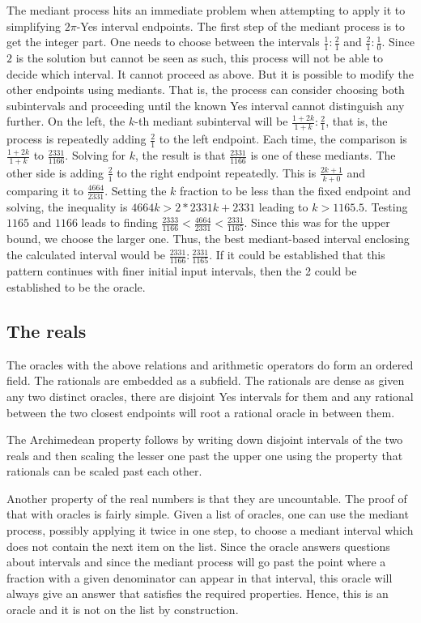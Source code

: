 \documentclass[12pt]{article}
\begin{document}
The mediant process hits an immediate problem when attempting to apply it to simplifying $2\pi$-Yes  interval endpoints. The first step of the mediant process is to get the integer part. One needs to choose between the intervals $\frac{1}{1}:\frac{2}{1}$ and $\frac{2}{1}:\frac{1}{0}$. Since $2$ is the solution but cannot be seen as such, this process will not be able to decide which interval. It cannot proceed as above. But it is possible to modify the other endpoints using mediants. That is, the process can consider choosing both subintervals and proceeding until the known Yes interval cannot distinguish any further. On the left, the $k$-th mediant subinterval will be $\frac{1 + 2k}{1+k}:\frac{2}{1}$, that is, the process is repeatedly adding $\frac{2}{1}$ to the left endpoint. Each time, the comparison is $\frac{1+2k}{1+k}$ to $\frac{2331}{1166}$. Solving for $k$, the result is that $\frac{2331}{1166}$ is one of these mediants. The other side is adding $\frac{2}{1}$ to the right endpoint repeatedly. This is $\frac{2k + 1}{k+0}$ and comparing it to $\frac{4664}{2331}$. Setting the $k$ fraction to be less than the fixed endpoint and solving, the inequality is $4664k > 2*2331 k + 2331$ leading to $k > 1165.5$. Testing $1165$ and $1166$ leads to finding $\frac{2333}{1166} < \frac{4664}{2331} < \frac{2331}{1165}$. Since this was for the upper bound, we choose the larger one. Thus, the best mediant-based interval enclosing the calculated interval would be $\frac{2331}{1166}: \frac{2331}{1165}$. If it could be established that this pattern continues with finer initial input intervals, then the 2 could be established to be the oracle. 



\subsection{The reals}

The oracles with the above relations and arithmetic operators do form an ordered field. The rationals are embedded as a subfield. The rationals are dense as given any two distinct oracles, there are disjoint Yes intervals for them and any rational between the two closest endpoints will root a rational oracle in between them. 

The Archimedean property follows by  writing down disjoint intervals of the two reals and then scaling the lesser one past the upper one using the property that rationals can be scaled past each other. 

Another property of the real numbers is that they are uncountable. The proof of that with oracles is fairly simple. Given a list of oracles, one can use the mediant process, possibly applying it twice in one step, to choose a mediant interval which does not contain the next item on the list. Since the oracle answers questions about intervals and since the mediant process will go past the point where a fraction with a given denominator can appear in that interval, this oracle will always give an answer that satisfies the required properties.  Hence, this is an oracle and it is not on the list by construction. 
\end{document}
